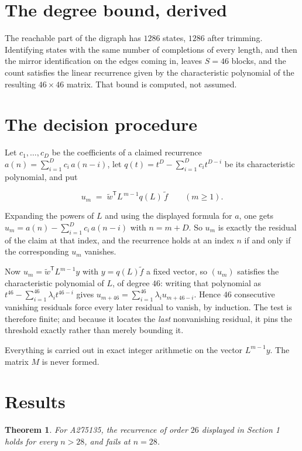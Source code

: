 \documentclass[11pt]{article}
\newtheorem{theorem}{Theorem}
\theoremstyle{definition}
\begin{document}
\section{The degree bound, derived}

The reachable part of the digraph has $1286$ states, $1286$ after trimming. Identifying states with the same number of completions of every length, and then the mirror identification on the edges coming in, leaves $S = 46$ blocks, and the count satisfies the linear recurrence given by the characteristic polynomial of the resulting $46\times46$ matrix. That bound is computed, not assumed.

\section{The decision procedure}

Let $c_1,\dots,c_D$ be the coefficients of a claimed recurrence $a(n) = \sum_{i=1}^{D} c_i\,a(n-i)$, let $q(t) = t^{D} - \sum_{i=1}^{D} c_i t^{D-i}$ be its characteristic polynomial, and put

\[u_m \;=\; \tilde w^{\mathsf T} L^{\,m-1} q(L)\,\tilde f \qquad (m \ge 1).\]

Expanding the powers of $L$ and using the displayed formula for $a$, one gets $u_m = a(n) - \sum_{i=1}^{D} c_i\,a(n-i)$ with $n = m + D$. So $u_m$ is exactly the residual of the claim at that index, and the recurrence holds at an index $n$ if and only if the corresponding $u_m$ vanishes.

Now $u_m = \tilde w^{\mathsf T} L^{m-1} y$ with $y = q(L)\tilde f$ a fixed vector, so $(u_m)$ satisfies the characteristic polynomial of $L$, of degree $46$: writing that polynomial as $t^{46} - \sum_{i=1}^{46} \lambda_i t^{46-i}$ gives $u_{m+46} = \sum_{i=1}^{46} \lambda_i u_{m+46-i}$. Hence $46$ consecutive vanishing residuals force every later residual to vanish, by induction. The test is therefore finite; and because it locates the {\itshape last} nonvanishing residual, it pins the threshold exactly rather than merely bounding it.

Everything is carried out in exact integer arithmetic on the vector $L^{m-1}y$. The matrix $M$ is never formed.

\section{Results}

\begin{theorem} For A275135, the recurrence of order $26$ displayed in Section 1 holds for every $n > 28$, and fails at $n = 28$.\end{theorem}
\end{document}
